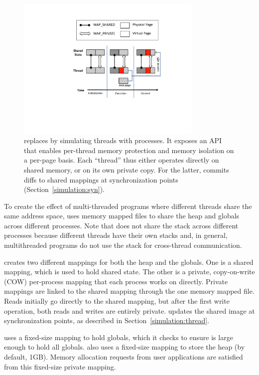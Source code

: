 \begin{figure}[!t]
\centering
\includegraphics[width=3.5in]{figure/sheriffframework.pdf}
\caption{
\sheriff{} replaces \pthreads{} by simulating threads
with processes. It exposes an API that enables per-thread memory protection and memory isolation on a per-page basis. Each ``thread'' thus either operates directly
on shared memory, or on its own private
copy. For the latter, \sheriff{} commits diffs to shared mappings at synchronization
points (Section~\ref{simulation:syn}).
\label{fig:overview}}
\end{figure}

To create the effect of multi-threaded programs where
different threads share the same address space, \sheriff{} uses
memory mapped files to share the heap and globals across different
processes.  Note that \sheriff{} does not share the stack across
different processes because different threads have their own stacks
and, in general, multithreaded programs do not use the stack for cross-thread
communication.

\sheriff{} creates two different mappings for both the heap and the
globals.  One is a shared mapping, which is used to hold shared state.
The other is a private, copy-on-write (COW) per-process mapping that
each process works on directly.  Private mappings are linked to the
shared mapping through the one memory mapped file. Reads initially go
directly to the shared mapping, but after the first write operation,
both reads and writes are entirely private. \sheriff{}
updates the shared image at synchronization points, as described in
Section~\ref{simulation:thread}.

\sheriff{} uses a fixed-size mapping to hold
globals, which it checks to ensure is large enough to hold all
globals. \sheriff{} also uses a fixed-size mapping to store the heap
(by default, 1GB). Memory allocation requests from user
applications are satisfied from this fixed-size private mapping.

